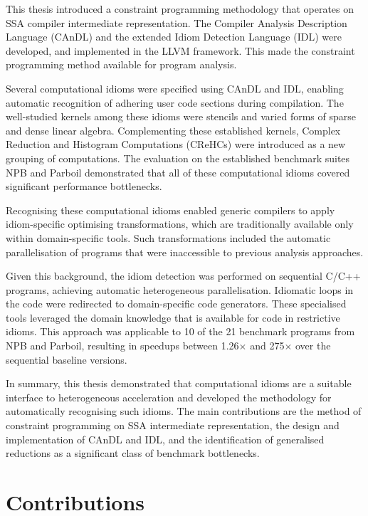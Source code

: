 
    This thesis introduced a constraint programming methodology that operates on
    SSA compiler intermediate representation.
    The Compiler Analysis Description Language (CAnDL) and the extended Idiom
    Detection Language (IDL) were developed, and implemented in the LLVM
    framework.
    This made the constraint programming method available for program analysis.

    Several computational idioms were specified using CAnDL and IDL, enabling
    automatic recognition of adhering user code sections during compilation.
    The well-studied kernels among these idioms were stencils and varied
    forms of sparse and dense linear algebra.
    Complementing these established kernels, Complex Reduction and Histogram
    Computations (CReHCs) were introduced as a new grouping of computations.
    The evaluation on the established benchmark suites NPB and Parboil demonstrated
    that all of these computational idioms covered significant performance
    bottlenecks.

    Recognising these computational idioms enabled generic compilers to apply
    idiom-specific optimising transformations, which are traditionally available
    only within domain-specific tools.
    Such transformations included the automatic parallelisation of programs that
    were inaccessible to previous analysis approaches.

    Given this background, the idiom detection was performed on sequential C/C++
    programs, achieving automatic heterogeneous parallelisation.
    Idiomatic loops in the code were redirected to domain-specific code
    generators.
    These specialised tools leveraged the domain knowledge that is available for
    code in restrictive idioms.
    This approach was applicable to 10 of the 21 benchmark programs from NPB and
    Parboil, resulting in speedups between 1.26$\times$ and 275$\times$ over the
    sequential baseline versions.

    In summary, this thesis demonstrated that computational idioms are a
    suitable interface to heterogeneous acceleration and developed the
    methodology for automatically recognising such idioms.
    The main contributions are the method of constraint programming on SSA
    intermediate representation, the design and implementation of CAnDL and IDL,
    and the identification of generalised reductions as a significant class of
    benchmark bottlenecks.

\section{Contributions}

